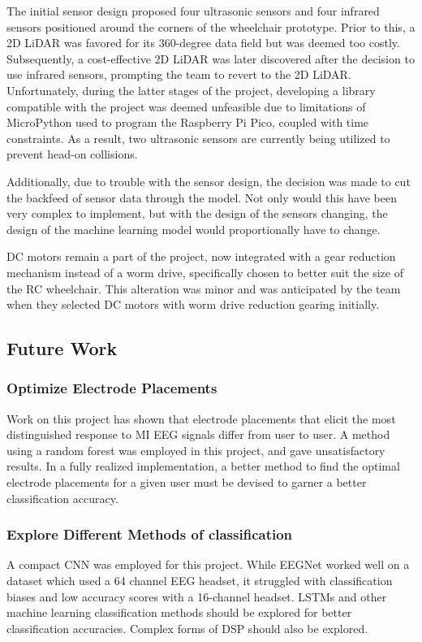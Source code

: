 \documentclass[conference]{IEEEtran}
\begin{document}
        The initial sensor design proposed four ultrasonic sensors and four infrared sensors positioned around the corners of the wheelchair prototype. Prior to this, a 2D LiDAR was favored for its 360-degree data field but was deemed too costly. Subsequently, a cost-effective 2D LiDAR was later discovered after the decision to use infrared sensors, prompting the team to revert to the 2D LiDAR. Unfortunately, during the latter stages of the project, developing a library compatible with the project was deemed unfeasible due to limitations of MicroPython used to program the Raspberry Pi Pico, coupled with time constraints. As a result, two ultrasonic sensors are currently being utilized to prevent head-on collisions. 

        Additionally, due to trouble with the sensor design, the decision was made to cut the backfeed of sensor data through the model. Not only would this have been very complex to implement, but with the design of the sensors changing, the design of the machine learning model would proportionally have to change. 
        
        DC motors remain a part of the project, now integrated with a gear reduction mechanism instead of a worm drive, specifically chosen to better suit the size of the RC wheelchair. This alteration was minor and was anticipated by the team when they selected DC motors with worm drive reduction gearing initially. 

            
    \subsection{Future Work}
        \subsubsection{Optimize Electrode Placements} 
        Work on this project has shown that electrode placements that elicit the most distinguished response to MI EEG signals differ from user to user. A method using a random forest was employed in this project, and gave unsatisfactory results. In a fully realized implementation, a better method to find the optimal electrode placements for a given user must be devised to garner a better classification accuracy. 
        \subsubsection{Explore Different Methods of classification}
        A compact CNN was employed for this project. While EEGNet worked well on a dataset which used a 64 channel EEG headset, it struggled with classification biases and low accuracy scores with a 16-channel headset. LSTMs and other machine learning classification methods should be explored for better classification accuracies. Complex forms of DSP should also be explored.
\end{document}

